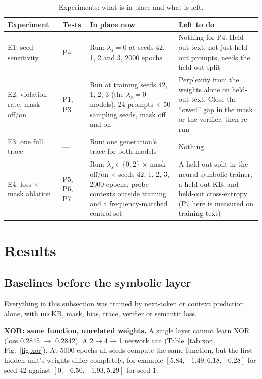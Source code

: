 \documentclass[letterpaper, 10pt, conference]{IEEEtran}
\begin{document}
\begin{table}[t]
\caption{Experiments: what is in place and what is left.}\label{tab:exp}
\centering\footnotesize\setlength{\tabcolsep}{4pt}
\begin{tabular}{@{}L{3.2cm}L{1.3cm}L{6.4cm}L{5.9cm}@{}}
\toprule
Experiment & Tests & In place now & Left to do\\
\midrule
E1: seed sensitivity & P4 & Run: $\lambda_s{=}0$ at seeds 42, 1, 2 and 3, 2000 epochs & Nothing for P4. Held-out text, not just held-out prompts, needs the held-out split\\
E2: violation rate, mask off/on & P1, P3 & Run at training seeds 42, 1, 2, 3 (the $\lambda_s{=}0$ models), 24 prompts $\times$ 50 sampling seeds, mask off and on & Perplexity from the weights alone on held-out text. Close the ``owed'' gap in the mask or the verifier, then re-run\\
E3: one full trace & --- & Run: one generation's trace for both models & Nothing\\
E4: loss $\times$ mask ablation & P5, P6, P7 & Run: $\lambda_s\in\{0,2\}$ $\times$ mask off/on $\times$ seeds 42, 1, 2, 3, 2000 epochs, probe contexts outside training and a frequency-matched control set & A held-out split in the neural-symbolic trainer, a held-out KB, and held-out cross-entropy (P7 here is measured on training text)\\
\bottomrule
\end{tabular}
\end{table}

\section{Results}\label{sec:results}
\subsection{Baselines before the symbolic layer}
Everything in this subsection was trained by next-token or context prediction alone, with \textbf{no} KB, mask, bias, trace, verifier or semantic loss.

\textbf{XOR: same function, unrelated weights.} A single layer cannot learn XOR (loss 0.2845 $\to$ 0.2842). A 2$\to$4$\to$1 network can (Table~\ref{tab:xor}, Fig.~\ref{fig:xor}). At 5000 epochs all seeds compute the same function, but the first hidden unit's weights differ completely, for example $[5.84,-1.49,6.18,-0.28]$ for seed 42 against $[0,-6.50,-1.93,5.29]$ for seed 1.
\end{document}
